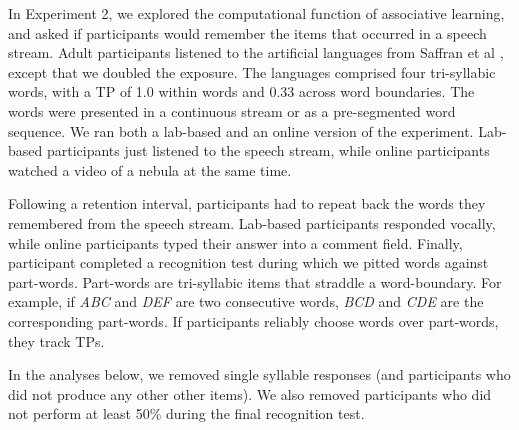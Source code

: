 \documentclass[]{article}
\begin{document}
\clearpage


In Experiment 2, we explored the computational function of associative learning, and asked if participants would remember the items that occurred in a speech stream. Adult participants listened to the artificial languages from Saffran et al \citep{Saffran-Science}, except that we doubled the exposure. The languages comprised four tri-syllabic words, with a TP of 1.0 within words and 0.33 across word boundaries. The words were presented in a continuous stream or as a pre-segmented word sequence. We ran both a lab-based and an online version of the experiment. Lab-based participants just listened to the speech stream, while online participants watched a video of a nebula at the same time.

Following a retention interval, participants had to repeat back the words they remembered from the speech stream. Lab-based participants responded vocally, while online participants typed their answer into a comment field. Finally, participant completed a recognition test during which we pitted words against part-words. Part-words are tri-syllabic items that straddle a word-boundary. For example, if \emph{ABC} and \emph{DEF} are two consecutive words, \emph{BCD} and \emph{CDE} are the corresponding part-words. If participants reliably choose words over part-words, they track TPs.

In the analyses below, we removed single syllable responses (and participants who did not produce any other other items). We also removed participants who did not perform at least 50\% during the final recognition test.

\end{document}
